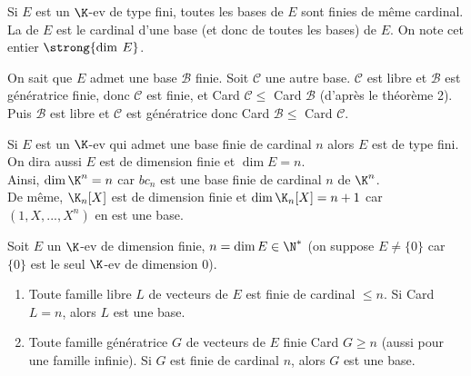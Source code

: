 \documentclass[12pt, a4paper]{report}
\begin{document}
\begin{corollaire}{}{}
Si $E$ est un $\K$-ev de type fini, toutes les bases de $E$ sont finies de même cardinal. \\
La  de $E$ est le cardinal d'une base (et donc de toutes les bases) de $E$. On note cet entier $\strong{\dim \: E}$.
\end{corollaire}

\begin{demo}{}
On sait que $E$ admet une base $\mathcal{B}$ finie. Soit $\mathcal{C}$ une autre base. $\mathcal{C}$ est libre et $\mathcal{B}$ est génératrice finie, donc $\mathcal{C}$ est finie, et Card $\mathcal{C} \le$ Card $\mathcal{B}$ (d'après le théorème 2). \\
Puis $\mathcal{B}$ est libre et $\mathcal{C}$ est génératrice donc Card $\mathcal{B} \le$ Card $\mathcal{C}$.
\end{demo}

\begin{remarque}{}
Si $E$ est un $\K$-ev qui admet une base finie de cardinal $n$ alors $E$ est de type fini. \\
On dira aussi $E$ est de dimension finie et $\dim E = n$. \\
Ainsi, $\dim \K^n = n$ car $bc_n$ est une base finie de cardinal $n$ de $\K^n$. \\
De même, $\K_n[X]$ est de dimension finie et $\dim \K_n[X] = n+1$ car $(1,X,...,X^n)$ en est une base.
\end{remarque}

\begin{theoreme}{}{}
Soit $E$ un $\K$-ev de dimension finie, $n = \dim E \in \N^*$ (on suppose $E \ne \{0\}$ car $\{0\}$ est le seul $\K$-ev de dimension $0$). \\
\begin{enumerate}
	\item Toute famille libre $L$ de vecteurs de $E$ est finie de cardinal $\le n$. Si Card $L = n$, alors $L$ est une base.
	\item Toute famille génératrice $G$ de vecteurs de $E$ finie Card $G \ge n$ (aussi pour une famille infinie). Si $G$ est finie de cardinal $n$, alors $G$ est une base.
\end{enumerate}
\end{theoreme}
\end{document}
